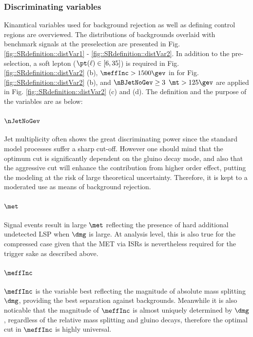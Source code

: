 \clearpage
\subsubsection{Discriminating variables}
Kinamtical variables used for background rejection as well as defining control regions are overviewed. The distributions of backgrounds overlaid with benchmark signals at the preselection are presented in Fig. \ref{fig::SRdefinition::distVar1} - \ref{fig::SRdefinition::distVar2}. In addition to the pre-selection, a soft lepton ($\pt(\ell)\in[6,35]$) is required in Fig. \ref{fig::SRdefinition::distVar2} (b), $\meffInc>1500\gev$ in for Fig. \ref{fig::SRdefinition::distVar2} (b), and $\nBJetNoGev \geq3 \,\,\, \mt>125\gev$ are applied in Fig. \ref{fig::SRdefinition::distVar2} (c) and (d). The definition and the purpose of the variables are as below: \\

\paragraph{${\bf \nJetNoGev}$}
Jet multiplicity often shows the great discriminating power since the standard model processes suffer a sharp cut-off.
However one should mind that the optimum cut is significantly dependent on the gluino decay mode, and also that the aggressive cut will enhance the contribution from higher order effect, putting the modeling at the risk of large theoretical uncertainty.
Therefore, it is kept to a moderated use as means of background rejection. \\

\paragraph{${\bf \met}$}
Signal events result in large $\met$ reflecting the presence of hard additional undetected LSP when $\dmg$ is large.
At analysis level, this is also true for the compressed case given that the MET via ISRs is nevertheless required for the trigger sake as described above.

\paragraph{${\bf \meffInc}$} 
$\meffInc$ is the variable best reflecting the magnitude of absolute mass splitting $\dmg$, providing the best separation against backgrounds.
Meanwhile it is also noticable that the magnitude of $\meffInc$ is almost uniquely determined by $\dmg$, regardless of the relative mass splitting and gluino decays, 
therefore the optimal cut in $\meffInc$ is highly universal.


